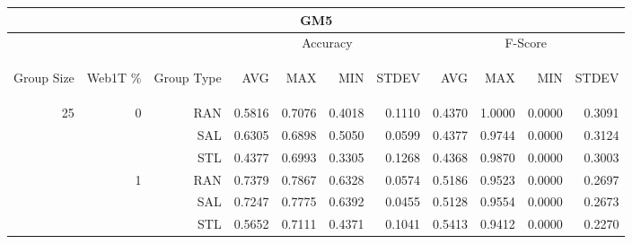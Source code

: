 \begin{center}
\begin{table}[htbp] 
 \begin{center}
\begin{tabular}{ | r | r | r | r | r | r | r | r | r | r | r |}
\hline
\multicolumn{11}{|c|}{GM5}\\
\hline
 & & & \multicolumn{4}{|c|}{Accuracy} & \multicolumn{4}{|c|}{F-Score}\\ \cline{4-11}
\begin{sideways}Group Size\end{sideways} & \begin{sideways}Web1T \%\end{sideways} & \begin{sideways}Group Type\end{sideways} & \begin{sideways}AVG\end{sideways} & \begin{sideways}MAX\end{sideways} & \begin{sideways}MIN\end{sideways} & \begin{sideways}STDEV\end{sideways} & \begin{sideways}AVG\end{sideways} & \begin{sideways}MAX\end{sideways} & \begin{sideways}MIN\end{sideways} & \begin{sideways}STDEV\end{sideways}\\
\hline
\multirow{12}{*}{25}
 & \multirow{3}{*}{0} & RAN & 0.5816 & 0.7076 & 0.4018 & 0.1110 & 0.4370 & 1.0000 & 0.0000 & 0.3091\\ \cline{3-11}
 &   & SAL & 0.6305 & 0.6898 & 0.5050 & 0.0599 & 0.4377 & 0.9744 & 0.0000 & 0.3124\\ \cline{3-11}
 &   & STL & 0.4377 & 0.6993 & 0.3305 & 0.1268 & 0.4368 & 0.9870 & 0.0000 & 0.3003\\ \cline{2-11}
 & \multirow{3}{*}{1} & RAN & 0.7379 & 0.7867 & 0.6328 & 0.0574 & 0.5186 & 0.9523 & 0.0000 & 0.2697\\ \cline{3-11}
 &   & SAL & 0.7247 & 0.7775 & 0.6392 & 0.0455 & 0.5128 & 0.9554 & 0.0000 & 0.2673\\ \cline{3-11}
 &   & STL & 0.5652 & 0.7111 & 0.4371 & 0.1041 & 0.5413 & 0.9412 & 0.0000 & 0.2270\\ \cline{2-11}

\end{tabular}
\end{center}
\end{table}
\end{center}
